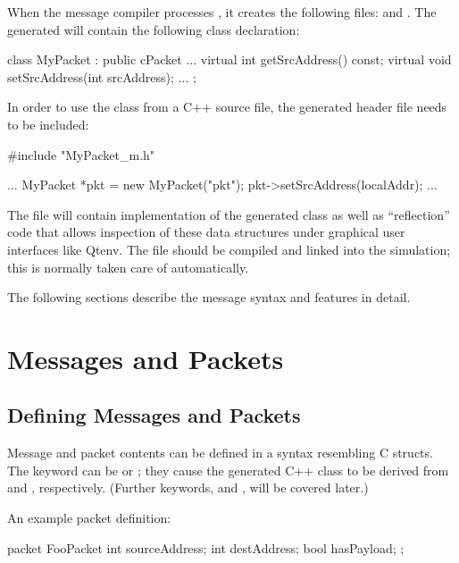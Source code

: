 When the message compiler processes , it creates the
following files:  and . The
generated  will contain the following class declaration:

\begin{cpp}
class MyPacket : public cPacket {
    ...
    virtual int getSrcAddress() const;
    virtual void setSrcAddress(int srcAddress);
    ...
};
\end{cpp}

In order to use the  class from a C++ source file, the
generated header file needs to be included:

\begin{cpp}
#include "MyPacket_m.h"

...
MyPacket *pkt = new MyPacket("pkt");
pkt->setSrcAddress(localAddr);
...
\end{cpp}

The  file will contain implementation of the generated
 class as well as ``reflection'' code that allows inspection of
these data structures under graphical user interfaces like Qtenv. The
 file should be compiled and linked into the simulation;
this is normally taken care of automatically.

The following sections describe the message syntax and features in detail.



\section{Messages and Packets}
\label{sec:msg-defs:messages-and-packets}

\subsection{Defining Messages and Packets}
\label{sec:msg-defs:defining-messages-and-packets}

Message and packet contents can be defined in a syntax resembling C structs.
The keyword can be  or ; they cause
the generated C++ class to be derived from  and
, respectively. (Further keywords,  and
, will be covered later.)

An example packet definition:

\begin{msg}
packet FooPacket
{
    int sourceAddress;
    int destAddress;
    bool hasPayload;
};
\end{msg}

